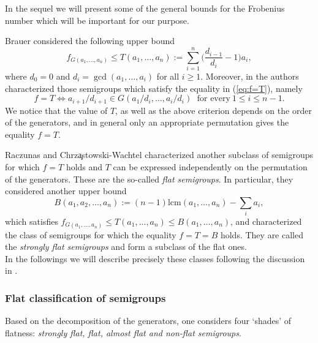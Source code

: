 \documentclass[oneside]{amsart}
\numberwithin{equation}{section}
\numberwithin{equation}{subsection}
\theoremstyle{plain}
\theoremstyle{definition}
\begin{document}
In the sequel we will present some of the general bounds for the Frobenius number which will be important for our purpose. 
\vspace{0.2cm}


Brauer \cite{art_brauer1} considered the following upper bound 
\begin{equation}\label{eq:f=T}
 f_{G(a_1,\dots,a_n)}\leq T(a_1,\dots,a_n):=\sum_{i=1}^n \Big(\frac{d_{i-1}}{d_i}-1\Big) a_i, 
\end{equation}
where $d_0=0$ and $d_i=\gcd(a_1,\dots,a_i)$ for all $i\geq 1$.  Moreover, in \cite{art_brauer2} the authors characterized those semigroups which satisfy the equality in (\ref{eq:f=T}), namely 
$$ f=T\iff a_{i+1}/d_{i+1}\in G(a_1/d_i,\dots,a_{i}/d_{i})\,\ \ \mbox{for every} \ 1 \leq i\leq n-1.$$
We notice that the value of $T$, as well as the above criterion depends on the order of the generators, and in general only an appropriate permutation gives the equality $f=T$.

Raczunas and Chrz\c{a}stowski-Wachtel \cite{art_rch} 
characterized another subclass of semigroups for which $f=T$ holds and $T$ can be expressed  independently on the permutation of  the generators. These are the so-called {\it flat semigroups}. 
In particular, they considered another upper bound 
\begin{equation}\label{eq:B}
B(a_1,a_2,\dots,a_n):=(n-1)\mathrm{lcm}(a_1,\dots,a_n)-\sum_i a_i,
\end{equation}
which satisfies 
$ f_{G(a_1,\dots,a_n)}\le T(a_1,\dots,a_n)\le B(a_1,\dots,a_n)$,  
and characterized the class of semigroups for which the equality $f=T=B$ holds. They are called the {\it strongly flat semigroups} and form a subclass of the flat ones. \\
In the followings we will describe precisely these classes following the discussion in \cite{art_rch}.




\subsubsection{\bf Flat classification of semigroups  \cite{art_rch}}\label{ss:classsgp}
Based on the decomposition of the generators, one considers four  `shades' 
of flatness: {\it strongly flat, flat, almost flat and non-flat semigroups}.
\end{document}
